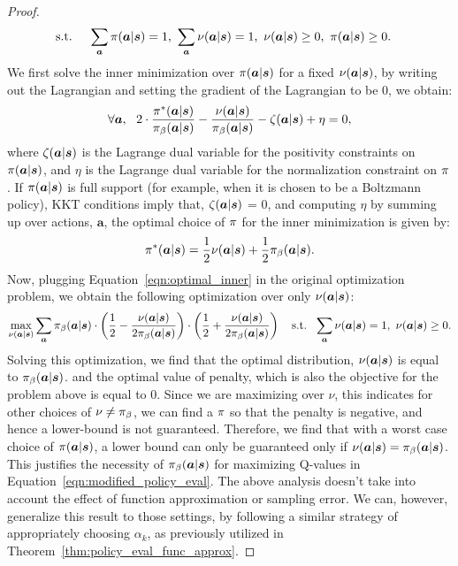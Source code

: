 \begin{proof}
\begin{align*}
    \text{s.t.}~~& ~~ \sum_{\boldsymbol{a}} \pi(\boldsymbol{a}|\boldsymbol{s}) = 1,~ \sum_{\boldsymbol{a}} \nu(\boldsymbol{a}|\boldsymbol{s}) = 1,~ \nu(\boldsymbol{a}|\boldsymbol{s}) \geq 0,~ \pi(\boldsymbol{a}|\boldsymbol{s}) \geq 0. 
\end{align*}
We first solve the inner minimization over $\pi(\boldsymbol{a}|\boldsymbol{s})$ for a fixed $\nu(\boldsymbol{a}|\boldsymbol{s})$, by writing
out the Lagrangian and setting the gradient of the Lagrangian to be 0, we obtain:
\begin{equation*}
    \forall \boldsymbol{a}, ~~ 2 \cdot \frac{\pi^*(\boldsymbol{a}|\boldsymbol{s})}{{\pi_\beta}(\boldsymbol{a}|\boldsymbol{s})} - \frac{\nu(\boldsymbol{a}|\boldsymbol{s})}{{\pi_\beta}(\boldsymbol{a}|\boldsymbol{s})} - \zeta(\boldsymbol{a}|\boldsymbol{s}) + \eta = 0, 
\end{equation*}
where $\zeta(\boldsymbol{a}|\boldsymbol{s})$ is the Lagrange dual variable for the positivity constraints on $\pi(\boldsymbol{a}|\boldsymbol{s})$, and $\eta$ is the Lagrange dual variable for the normalization constraint on $\pi$. If $\pi(\boldsymbol{a}|\boldsymbol{s})$ is full support (for example, when it is chosen to be a Boltzmann policy), KKT conditions imply that, $\zeta(\boldsymbol{a}|\boldsymbol{s})$ = 0, and computing $\eta$ by summing up over actions, $\mathbf{a}$, the optimal choice of $\pi$ for the inner minimization is given by:
\begin{equation}
    \pi^*(\boldsymbol{a}|\boldsymbol{s}) = \frac{1}{2} \nu(\boldsymbol{a}|\boldsymbol{s}) + \frac{1}{2} {\pi_\beta}(\boldsymbol{a}|\boldsymbol{s}).
    \label{eqn:optimal_inner}
\end{equation}
Now, plugging Equation~\ref{eqn:optimal_inner} in the original optimization problem, we obtain the following optimization over only $\nu(\boldsymbol{a}|\boldsymbol{s})$:
\begin{equation}
    \max_{\nu(\boldsymbol{a}|\boldsymbol{s})} \sum_{\boldsymbol{a}} {\pi_\beta}(\boldsymbol{a}|\boldsymbol{s}) \cdot \left( \frac{1}{2} - \frac{\nu(\boldsymbol{a}|\boldsymbol{s})}{2 {\pi_\beta}(\boldsymbol{a}|\boldsymbol{s})} \right) \cdot \left( \frac{1}{2} + \frac{\nu(\boldsymbol{a}|\boldsymbol{s})}{2 {\pi_\beta}(\boldsymbol{a}|\boldsymbol{s})} \right)~~~ \text{s.t.}~~ \sum_{\boldsymbol{a}} \nu(\boldsymbol{a}|\boldsymbol{s}) = 1,~ \nu(\boldsymbol{a}|\boldsymbol{s}) \geq 0.
\end{equation}
Solving this optimization, we find that the optimal distribution, $\nu(\boldsymbol{a}|\boldsymbol{s})$ is equal to ${\pi_\beta}(\boldsymbol{a}|\boldsymbol{s})$. and the optimal value of penalty, which is also the objective for the problem above is equal to $0$. Since we are maximizing over $\nu$, this indicates for other choices of $\nu \neq {\pi_\beta}$, we can find a $\pi$ so that the penalty is negative, and hence a lower-bound is not guaranteed. Therefore, we find that with a worst case choice of $\pi(\boldsymbol{a}|\boldsymbol{s})$, a lower bound can only be guaranteed only if $\nu(\boldsymbol{a}|\boldsymbol{s}) = {\pi_\beta}(\boldsymbol{a}|\boldsymbol{s})$. This justifies the necessity of ${\pi_\beta}(\boldsymbol{a}|\boldsymbol{s})$ for maximizing Q-values in Equation~\ref{eqn:modified_policy_eval}. The above analysis doesn't take into account the effect of function approximation or sampling error. We can, however, generalize this result to those settings, by following a similar strategy of appropriately choosing $\alpha_k$, as previously utilized in Theorem~\ref{thm:policy_eval_func_approx}.
\end{proof}

